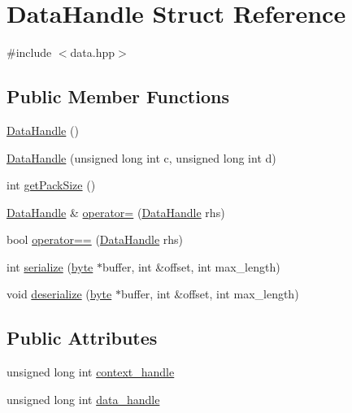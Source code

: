 \hypertarget{struct_data_handle}{
\section{DataHandle Struct Reference}
\label{struct_data_handle}
}


{\ttfamily \#include $<$data.hpp$>$}\subsection*{Public Member Functions}
\begin{DoxyCompactItemize}
\item 
\hyperlink{struct_data_handle_a1b1c698a78fb66cf90af8b2a926ab041}{DataHandle} ()
\item 
\hyperlink{struct_data_handle_a7c654e8712517c6fdf0fcab379d53b76}{DataHandle} (unsigned long int c, unsigned long int d)
\item 
int \hyperlink{struct_data_handle_a5f555e8f89e12b36a6f831059fb10124}{getPackSize} ()
\item 
\hyperlink{struct_data_handle}{DataHandle} \& \hyperlink{struct_data_handle_a5fd92766a9d2d0de3a6ad1b0461b7bea}{operator=} (\hyperlink{struct_data_handle}{DataHandle} rhs)
\item 
bool \hyperlink{struct_data_handle_a90328ac319872e9b491f118f9a5a6ab8}{operator==} (\hyperlink{struct_data_handle}{DataHandle} rhs)
\item 
int \hyperlink{struct_data_handle_a5a107dc8166953db8bb7de3e1a74391f}{serialize} (\hyperlink{engine_8hpp_a0c8186d9b9b7880309c27230bbb5e69d}{byte} $\ast$buffer, int \&offset, int max\_\-length)
\item 
void \hyperlink{struct_data_handle_a4abd5569c8a2cb0ff6fdca749765aa70}{deserialize} (\hyperlink{engine_8hpp_a0c8186d9b9b7880309c27230bbb5e69d}{byte} $\ast$buffer, int \&offset, int max\_\-length)
\end{DoxyCompactItemize}
\subsection*{Public Attributes}
\begin{DoxyCompactItemize}
\item 
unsigned long int \hyperlink{struct_data_handle_a85a5c067d1fa51712432b28feefe7d2f}{context\_\-handle}
\item 
unsigned long int \hyperlink{struct_data_handle_a8ef23cf8adc3b32ae4977de4537c673c}{data\_\-handle}
\end{DoxyCompactItemize}


